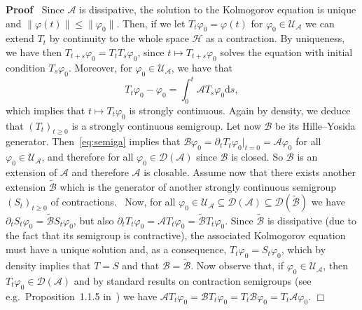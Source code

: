 \documentclass{article}
\newcommand{\mathd}{\mathrm{d}}
\newenvironment{proof}{\noindent\textbf{Proof\ }}{\hspace*{\fill}$\Box$\medskip}
\begin{document}
\begin{proof}
  Since $\mathcal{A}$ is dissipative, the solution to the Kolmogorov equation
  is unique and $\| \varphi (t) \| \leqslant \| \varphi_0 \|$. Then, if we let
  $T_t \varphi_0 = \varphi (t)$ for $\varphi_0 \in \mathcal{U}_{\mathcal{A}}$
  we can extend $T_t$ by continuity to the whole space $\mathcal{H}$ as a
  contraction. By uniqueness, we have then $T_{t + s} \varphi_0 = T_t T_s
  \varphi_0$, since $t \mapsto T_{t + s} \varphi_0$ solves the equation with
  initial condition $T_s \varphi_0$. Moreover, for $\varphi_0 \in
  \mathcal{U}_{\mathcal{A}}$, we have that
  \begin{equation}
    T_t \varphi_0 - \varphi_0 = \int_0^t \mathcal{A}T_s \varphi_0 \mathd s,
    \label{eq:semiga}
  \end{equation}
  which implies that $t \mapsto T_t \varphi_0$ is strongly continuous. Again
  by density, we deduce that $(T_t)_{t \geqslant 0}$ is a strongly continuous
  semigroup. Let now $\mathcal{B}$ be its Hille--Yosida generator.
  Then~{\eqref{eq:semiga}} implies that $\mathcal{B} \varphi_0 = \partial_t
  T_t \varphi_0 |_{t = 0} =\mathcal{A} \varphi_0$ for all $\varphi_0 \in
  \mathcal{U}_{\mathcal{A}}$, and therefore for all $\varphi_0 \in \mathcal{D}
  (\mathcal{A})$ since $\mathcal{B}$ is closed. So $\mathcal{B}$ is an
  extension of $\mathcal{A}$ and therefore $\mathcal{A}$ is closable. Assume
  now that there exists another extension $\tilde{\mathcal{B}}$ which is the
  generator of another strongly continuous semigroup $(S_t)_{t \geqslant 0}$
  of contractions. \ Now, for all $\varphi_0 \in \mathcal{U}_{\mathcal{A}}
  \subseteq \mathcal{D} (\mathcal{A}) \subseteq \mathcal{D}
  (\tilde{\mathcal{B}})$ we have $\partial_t S_t \varphi_0 =
  \tilde{\mathcal{B}} S_t \varphi_0$, but also $\partial_t T_t \varphi_0
  =\mathcal{A}T_t \varphi_0 = \tilde{\mathcal{B}} T_t \varphi_0$. Since
  $\tilde{\mathcal{B}}$ is dissipative (due to the fact that its semigroup is
  contractive), the associated Kolmogorov equation must have a unique solution
  and, as a consequence, $T_t \varphi_0 = S_t \varphi_0$, which by density
  implies that $T = S$ and that $\mathcal{B}= \tilde{\mathcal{B}}$. Now
  observe that, if $\varphi_0 \in \mathcal{U}_{\mathcal{A}}$, then $T_t
  \varphi_0 \in \mathcal{D} (\mathcal{A})$ and by standard results on
  contraction semigroups (see e.g.~Proposition~1.1.5
  in~{\cite{ethier_markov_2005}}) we have $\mathcal{A}T_t \varphi_0
  =\mathcal{B}T_t \varphi_0 = T_t \mathcal{B} \varphi_0 = T_t \mathcal{A}
  \varphi_0$.
\end{proof}
\end{document}
